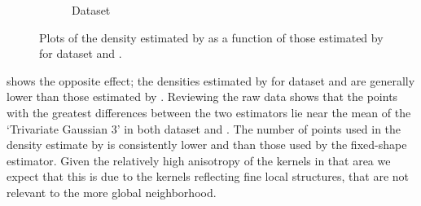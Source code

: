 \begin{figure}
\begin{subfigure}{0.23\textwidth}
				\caption{Dataset \baakmanTwo}
				\label{fig:discussion:performance:mbevssambe:baakman2}
			\end{subfigure}	
			\caption{Plots of the density estimated by \sambe as a function of those estimated by \mbe for dataset %
				\ferdosiTwo and %
				\baakmanTwo.
			}
			\label{fig:discussion:performance:two:mbevssambe}
		\end{figure}
		
		 shows the opposite effect; the densities estimated by \sambe for dataset \ferdosiThree and \baakmanThree are generally lower than those estimated by \mbe. Reviewing the raw data shows that the points with the greatest differences between the two estimators lie near the mean of the `Trivariate Gaussian 3' in both dataset \ferdosiThree and \baakmanThree. The number of points used in the density estimate by \sambe is consistently lower and than those used by the fixed-shape estimator. Given the relatively high anisotropy of the kernels in that area we expect that this is due to the kernels reflecting fine local structures, that are not relevant to the more global neighborhood. 
